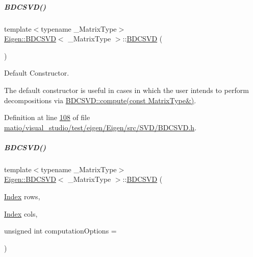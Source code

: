 \mbox{\label{group___s_v_d___module_a39514816d38f9c418cf3f3514b511c2c}} 
\subparagraph{\texorpdfstring{B\+D\+C\+S\+V\+D()}{BDCSVD()}\hspace{0.1cm}{\footnotesize\ttfamily [4/6]}}
{\footnotesize\ttfamily template$<$typename \+\_\+\+Matrix\+Type$>$ \\
\hyperlink{group___s_v_d___module_class_eigen_1_1_b_d_c_s_v_d}{Eigen\+::\+B\+D\+C\+S\+VD}$<$ \+\_\+\+Matrix\+Type $>$\+::\hyperlink{group___s_v_d___module_class_eigen_1_1_b_d_c_s_v_d}{B\+D\+C\+S\+VD} (\begin{DoxyParamCaption}{ }\end{DoxyParamCaption})\hspace{0.3cm}{\ttfamily [inline]}}



Default Constructor. 

The default constructor is useful in cases in which the user intends to perform decompositions via \hyperlink{group___s_v_d___module_acf27f41ed044d74ea8e8cbaf17ffdb04}{B\+D\+C\+S\+V\+D\+::compute(const Matrix\+Type\&)}. 

Definition at line \hyperlink{matio_2visual__studio_2test_2eigen_2_eigen_2src_2_s_v_d_2_b_d_c_s_v_d_8h_source_l00108}{108} of file \hyperlink{matio_2visual__studio_2test_2eigen_2_eigen_2src_2_s_v_d_2_b_d_c_s_v_d_8h_source}{matio/visual\+\_\+studio/test/eigen/\+Eigen/src/\+S\+V\+D/\+B\+D\+C\+S\+V\+D.\+h}.

\mbox{\label{group___s_v_d___module_a3e1fa48b3d042b7daf7392724a68bb60}} 
\subparagraph{\texorpdfstring{B\+D\+C\+S\+V\+D()}{BDCSVD()}\hspace{0.1cm}{\footnotesize\ttfamily [5/6]}}
{\footnotesize\ttfamily template$<$typename \+\_\+\+Matrix\+Type$>$ \\
\hyperlink{group___s_v_d___module_class_eigen_1_1_b_d_c_s_v_d}{Eigen\+::\+B\+D\+C\+S\+VD}$<$ \+\_\+\+Matrix\+Type $>$\+::\hyperlink{group___s_v_d___module_class_eigen_1_1_b_d_c_s_v_d}{B\+D\+C\+S\+VD} (\begin{DoxyParamCaption}\item[{\hyperlink{group___s_v_d___module_a6229a37997eca1072b52cca5ee7a2bec}{Index}}]{rows,  }\item[{\hyperlink{group___s_v_d___module_a6229a37997eca1072b52cca5ee7a2bec}{Index}}]{cols,  }\item[{unsigned int}]{computation\+Options = {} }\end{DoxyParamCaption})\hspace{0.3cm}{\ttfamily [inline]}}



